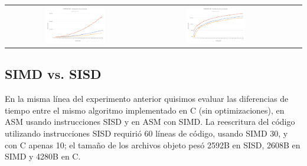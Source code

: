 \begin{center}
	\begin{tabular}{cccc}
	  \includegraphics[width=0.45\textwidth]{imagenes/testperformance/TEMPperformance.png} &
	  \includegraphics[width=0.45\textwidth]{imagenes/testperformance/TEMPperformanceLOG.png} \\
	\end{tabular}
   \end{center}

\subsection{SIMD vs. SISD}

En la misma línea del experimento anterior quisimos evaluar las diferencias de tiempo entre el mismo algoritmo implementado en C (sin optimizaciones), en ASM usando instrucciones SISD y en ASM con SIMD. La reescritura del código utilizando instrucciones SISD requirió 60 líneas de código, usando SIMD 30, y con C apenas 10; el tamaño de los archivos objeto pesó 2592B en SISD, 2608B en SIMD y 4280B en C.

